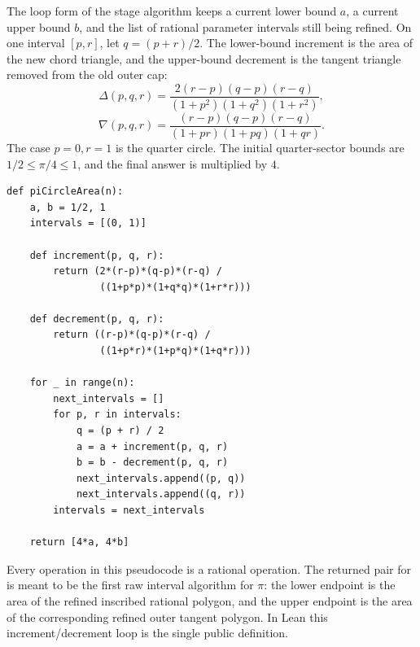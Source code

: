 \begin{definition}\label{def:circle-area-stage-algorithm}
The loop form of the stage algorithm keeps a current lower bound \(a\), a
current upper bound \(b\), and the list of rational parameter intervals still
being refined.  On one interval \([p,r]\), let \(q=(p+r)/2\).  The lower-bound
increment is the area of the new chord triangle, and the upper-bound decrement
is the tangent triangle removed from the old outer cap:
\[
  \Delta(p,q,r)=
    \frac{2(r-p)(q-p)(r-q)}
      {(1+p^2)(1+q^2)(1+r^2)},
\]
\[
  \nabla(p,q,r)=
    \frac{(r-p)(q-p)(r-q)}
      {(1+pr)(1+pq)(1+qr)}.
\]
The case \(p=0,r=1\) is the quarter circle.  The initial quarter-sector bounds
are \(1/2\le\pi/4\le1\), and the final answer is multiplied by \(4\).
\begin{verbatim}
def piCircleArea(n):
    a, b = 1/2, 1
    intervals = [(0, 1)]

    def increment(p, q, r):
        return (2*(r-p)*(q-p)*(r-q) /
                ((1+p*p)*(1+q*q)*(1+r*r)))

    def decrement(p, q, r):
        return ((r-p)*(q-p)*(r-q) /
                ((1+p*r)*(1+p*q)*(1+q*r)))

    for _ in range(n):
        next_intervals = []
        for p, r in intervals:
            q = (p + r) / 2
            a = a + increment(p, q, r)
            b = b - decrement(p, q, r)
            next_intervals.append((p, q))
            next_intervals.append((q, r))
        intervals = next_intervals

    return [4*a, 4*b]
\end{verbatim}
Every operation in this pseudocode is a rational operation.  The returned pair
for  is meant to be the first raw interval algorithm for
\(\pi\): the lower endpoint is the area of the refined inscribed rational
polygon, and the upper endpoint is the area of the corresponding refined outer
tangent polygon.  In Lean this increment/decrement loop is the single public
 definition.
\end{definition}

